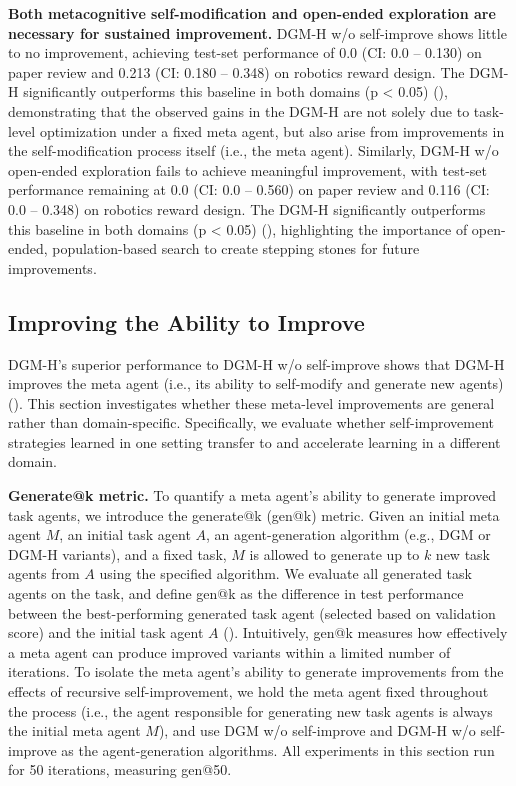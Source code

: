 \documentclass[]{fairmeta}
\begin{document}
\textbf{Both metacognitive self-modification and open-ended exploration are necessary for sustained improvement.}
DGM-H w/o self-improve \citep{huautomated} shows little to no improvement, achieving test-set performance of 0.0 (CI: 0.0 -- 0.130) on paper review and 0.213 (CI: 0.180 -- 0.348) on robotics reward design. The DGM-H significantly outperforms this baseline in both domains (p < 0.05) (), demonstrating that the observed gains in the DGM-H are not solely due to task-level optimization under a fixed meta agent, but also arise from improvements in the self-modification process itself (i.e., the meta agent).
Similarly, DGM-H w/o open-ended exploration fails to achieve meaningful improvement, with test-set performance remaining at 0.0 (CI: 0.0 -- 0.560) on paper review and 0.116 (CI: 0.0 -- 0.348) on robotics reward design. The DGM-H significantly outperforms this baseline in both domains (p < 0.05) (), highlighting the importance of open-ended, population-based search to create stepping stones for future improvements.

\subsection{Improving the Ability to Improve}
\label{sec:results-meta}

DGM-H's superior performance to DGM-H w/o self-improve shows that DGM-H improves the meta agent (i.e., its ability to self-modify and generate new agents) (). This section investigates whether these meta-level improvements are general rather than domain-specific. Specifically, we evaluate whether self-improvement strategies learned in one setting transfer to and accelerate learning in a different domain.

\textbf{Generate@k metric.} To quantify a meta agent's ability to generate improved task agents, we introduce the generate@k (gen@k) metric. Given an initial meta agent $M$, an initial task agent $A$, an agent-generation algorithm (e.g., DGM or DGM-H variants), and a fixed task, $M$ is allowed to generate up to $k$ new task agents from $A$ using the specified algorithm. We evaluate all generated task agents on the task, and define gen@k as the difference in test performance between the best-performing generated task agent (selected based on validation score) and the initial task agent $A$ (). Intuitively, gen@k measures how effectively a meta agent can produce improved variants within a limited number of iterations. To isolate the meta agent's ability to generate improvements from the effects of recursive self-improvement, we hold the meta agent fixed throughout the process (i.e., the agent responsible for generating new task agents is always the initial meta agent $M$), and use DGM w/o self-improve and DGM-H w/o self-improve as the agent-generation algorithms. All experiments in this section run for 50 iterations, measuring gen@50.
\end{document}
